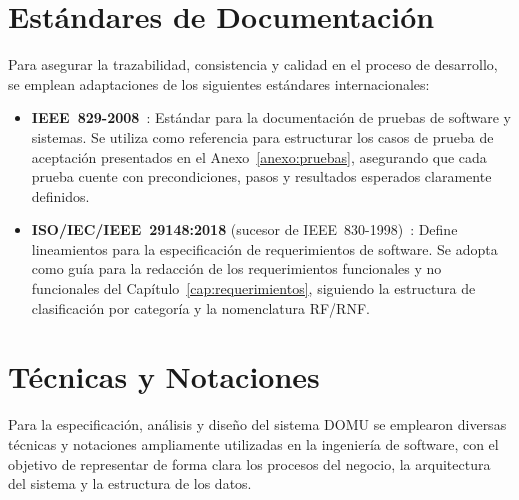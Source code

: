 \section{Estándares de Documentación}
Para asegurar la trazabilidad, consistencia y calidad en el proceso de desarrollo, se emplean adaptaciones de los siguientes estándares internacionales:
\begin{itemize}
    \item \textbf{IEEE~829-2008}~\cite{IEEE829-2008}: Estándar para la documentación de pruebas de software y sistemas. Se utiliza como referencia para estructurar los casos de prueba de aceptación presentados en el Anexo~\ref{anexo:pruebas}, asegurando que cada prueba cuente con precondiciones, pasos y resultados esperados claramente definidos.
    \item \textbf{ISO/IEC/IEEE~29148:2018} (sucesor de IEEE~830-1998)~\cite{IEEE830-1998}: Define lineamientos para la especificación de requerimientos de software. Se adopta como guía para la redacción de los requerimientos funcionales y no funcionales del Capítulo~\ref{cap:requerimientos}, siguiendo la estructura de clasificación por categoría y la nomenclatura RF/RNF.
\end{itemize}

\section{Técnicas y Notaciones}

Para la especificación, análisis y diseño del sistema DOMU se emplearon diversas técnicas y notaciones ampliamente utilizadas en la ingeniería de software, con el objetivo de representar de forma clara los procesos del negocio, la arquitectura del sistema y la estructura de los datos.

